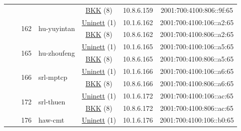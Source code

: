 \begin{small}
\begin{center}
\begin{longtable}{|c|c|c|c|c|c|c|c|}
  &  &  &  & \multicolumn{2}{|c|}{\tiny{\href{http://bkk.no}{BKK} (8)}} & \tiny{10.8.6.159} & \tiny{2001:700:4100:806::9f:65} \\* \cline{3-3}\cline{4-4}\cline{5-5}\cline{6-6}\cline{7-7}\cline{8-8}
  &  & \multirow{2}{*}{\tiny{162}} & \multicolumn{1}{|l|}{\multirow{2}{*}{\tiny{hu-yuyintan}}} & \multicolumn{2}{|c|}{\tiny{\href{https://www.uninett.no}{Uninett} (1)}} & \tiny{10.1.6.162} & \tiny{2001:700:4100:106::a2:65} \\* \cline{5-5}\cline{6-6}\cline{7-7}\cline{8-8}
  &  &  &  & \multicolumn{2}{|c|}{\tiny{\href{http://bkk.no}{BKK} (8)}} & \tiny{10.8.6.162} & \tiny{2001:700:4100:806::a2:65} \\* \cline{3-3}\cline{4-4}\cline{5-5}\cline{6-6}\cline{7-7}\cline{8-8}
  &  & \multirow{2}{*}{\tiny{165}} & \multicolumn{1}{|l|}{\multirow{2}{*}{\tiny{hu-zhoufeng}}} & \multicolumn{2}{|c|}{\tiny{\href{https://www.uninett.no}{Uninett} (1)}} & \tiny{10.1.6.165} & \tiny{2001:700:4100:106::a5:65} \\* \cline{5-5}\cline{6-6}\cline{7-7}\cline{8-8}
  &  &  &  & \multicolumn{2}{|c|}{\tiny{\href{http://bkk.no}{BKK} (8)}} & \tiny{10.8.6.165} & \tiny{2001:700:4100:806::a5:65} \\* \cline{3-3}\cline{4-4}\cline{5-5}\cline{6-6}\cline{7-7}\cline{8-8}
  &  & \multirow{2}{*}{\tiny{166}} & \multicolumn{1}{|l|}{\multirow{2}{*}{\tiny{srl-mptcp}}} & \multicolumn{2}{|c|}{\tiny{\href{https://www.uninett.no}{Uninett} (1)}} & \tiny{10.1.6.166} & \tiny{2001:700:4100:106::a6:65} \\* \cline{5-5}\cline{6-6}\cline{7-7}\cline{8-8}
  &  &  &  & \multicolumn{2}{|c|}{\tiny{\href{http://bkk.no}{BKK} (8)}} & \tiny{10.8.6.166} & \tiny{2001:700:4100:806::a6:65} \\* \cline{3-3}\cline{4-4}\cline{5-5}\cline{6-6}\cline{7-7}\cline{8-8}
  &  & \multirow{2}{*}{\tiny{172}} & \multicolumn{1}{|l|}{\multirow{2}{*}{\tiny{srl-thuen}}} & \multicolumn{2}{|c|}{\tiny{\href{https://www.uninett.no}{Uninett} (1)}} & \tiny{10.1.6.172} & \tiny{2001:700:4100:106::ac:65} \\* \cline{5-5}\cline{6-6}\cline{7-7}\cline{8-8}
  &  &  &  & \multicolumn{2}{|c|}{\tiny{\href{http://bkk.no}{BKK} (8)}} & \tiny{10.8.6.172} & \tiny{2001:700:4100:806::ac:65} \\* \cline{3-3}\cline{4-4}\cline{5-5}\cline{6-6}\cline{7-7}\cline{8-8}
  &  & \multirow{2}{*}{\tiny{176}} & \multicolumn{1}{|l|}{\multirow{2}{*}{\tiny{haw-cmt}}} & \multicolumn{2}{|c|}{\tiny{\href{https://www.uninett.no}{Uninett} (1)}} & \tiny{10.1.6.176} & \tiny{2001:700:4100:106::b0:65} \\* \cline{5-5}\cline{6-6}\cline{7-7}\cline{8-8}

\end{longtable}
\end{center}
\end{small}
